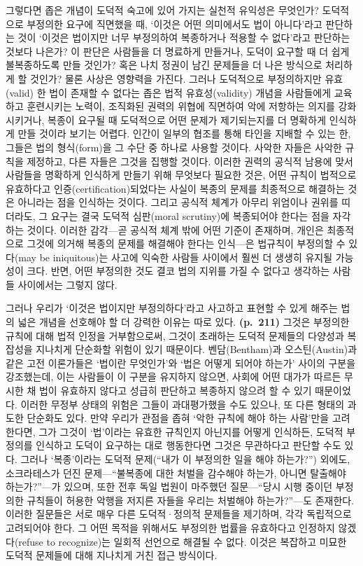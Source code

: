 그렇다면 좁은 개념이 도덕적 숙고에 있어 가지는 실천적 유익성은 무엇인가?
도덕적으로 부정의한 요구에 직면했을 때, `이것은 어떤 의미에서도 법이
아니다'라고 판단하는 것이 `이것은 법이지만 너무 부정의하여 복종하거나
적용할 수 없다'라고 판단하는 것보다 나은가? 이 판단은 사람들을 더
명료하게 만들거나, 도덕이 요구할 때 더 쉽게 불복종하도록 만들 것인가?
혹은 나치 정권이 남긴 문제들을 더 나은 방식으로 처리하게 할 것인가? 물론
사상은 영향력을 가진다. 그러나 도덕적으로 부정의하지만 유효(valid) 한
법이 존재할 수 없다는 좁은 법적 유효성(validity) 개념을 사람들에게
교육하고 훈련시키는 노력이, 조직화된 권력의 위협에 직면하여 악에
저항하는 의지를 강화시키거나, 복종이 요구될 때 도덕적으로 어떤 문제가
제기되는지를 더 명확하게 인식하게 만들 것이라 보기는 어렵다. 인간이
일부의 협조를 통해 타인을 지배할 수 있는 한, 그들은 법의 형식(form)을 그
수단 중 하나로 사용할 것이다. 사악한 자들은 사악한 규칙을 제정하고, 다른
자들은 그것을 집행할 것이다. 이러한 권력의 공식적 남용에 맞서 사람들을
명확하게 인식하게 만들기 위해 무엇보다 필요한 것은, 어떤 규칙이 법적으로
유효하다고 인증(certification)되었다는 사실이 복종의 문제를 최종적으로
해결하는 것은 아니라는 점을 인식하는 것이다. 그리고 공식적 체계가 아무리
위엄이나 권위를 띠더라도, 그 요구는 결국 도덕적 심판(moral scrutiny)에
복종되어야 한다는 점을 자각하는 것이다. 이러한 감각---곧 공식적 체계
밖에 어떤 기준이 존재하며, 개인은 최종적으로 그것에 의거해 복종의 문제를
해결해야 한다는 인식---은 법규칙이 부정의할 수 있다(may be iniquitous)는
사고에 익숙한 사람들 사이에서 훨씬 더 생생히 유지될 가능성이 크다. 반면,
어떤 부정의한 것도 결코 법의 지위를 가질 수 없다고 생각하는 사람들
사이에서는 그렇지 않다.

그러나 우리가 `이것은 법이지만 부정의하다'라고 사고하고 표현할 수 있게
해주는 법의 넓은 개념을 선호해야 할 더 강력한 이유는 따로 있다.
\textbf{(p.~211)} 그것은 부정의한 규칙에 대해 법적 인정을 거부함으로써,
그것이 초래하는 도덕적 문제들의 다양성과 복잡성을 지나치게 단순화할
위험이 있기 때문이다. 벤담(Bentham)과 오스틴(Austin)과 같은 고전
이론가들은 `법이란 무엇인가'와 `법은 어떻게 되어야 하는가' 사이의 구분을
강조했는데, 이는 사람들이 이 구분을 유지하지 않으면, 사회에 어떤 대가가
따르든 무시한 채 법이 유효하지 않다고 성급히 판단하고 복종하지 않으려 할
수 있기 때문이었다. 이러한 무정부 상태의 위험은 그들이 과대평가했을 수도
있으나, 또 다른 형태의 과도한 단순화도 있다. 만약 우리가 관점을 좁혀
`악한 규칙에 해야 하는 사람'만을 고려한다면, 그가
그것이 `법'이라는 유효한 규칙인지 아닌지를 어떻게 인식하든, 도덕적
부정의를 인식하고 도덕이 요구하는 대로 행동한다면 그것은 무관하다고
판단할 수도 있다. 그러나 `복종'이라는 도덕적 문제(``내가 이 부정의한
일을 해야 하는가?'') 외에도, 소크라테스가 던진 문제---``불복종에 대한
처벌을 감수해야 하는가, 아니면 탈출해야 하는가?''---가 있으며, 또한 전후
독일 법원이 마주했던 질문---``당시 시행 중이던 부정의한 규칙들이 허용한
악행을 저지른 자들을 우리는 처벌해야 하는가?''---도 존재한다. 이러한
질문들은 서로 매우 다른 도덕적·정의적 문제들을 제기하며, 각각 독립적으로
고려되어야 한다. 그 어떤 목적을 위해서도 부정의한 법률을 유효하다고
인정하지 않겠다(refuse to recognize)는 일회적 선언으로 해결될 수 없다.
이것은 복잡하고 미묘한 도덕적 문제들에 대해 지나치게 거친 접근 방식이다.

